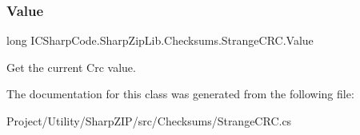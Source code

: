 \subsubsection{\texorpdfstring{Value}{Value}}
{\footnotesize\ttfamily long I\+C\+Sharp\+Code.\+Sharp\+Zip\+Lib.\+Checksums.\+Strange\+C\+R\+C.\+Value\hspace{0.3cm}{\ttfamily [get]}}



Get the current Crc value. 



The documentation for this class was generated from the following file\+:\begin{DoxyCompactItemize}
\item 
Project/\+Utility/\+Sharp\+Z\+I\+P/src/\+Checksums/Strange\+C\+R\+C.\+cs\end{DoxyCompactItemize}
